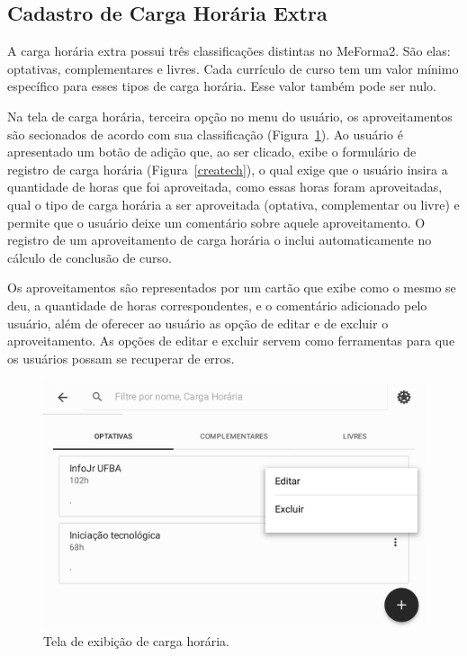 \subsection{Cadastro de Carga Horária Extra}
A carga horária extra possui três classificações distintas no MeForma2. São elas: optativas, complementares e livres. Cada currículo de curso tem um valor mínimo específico para esses tipos de carga horária. Esse valor também pode ser nulo.

Na tela de carga horária, terceira opção no menu do usuário, os aproveitamentos são secionados de acordo com sua classificação (Figura~\ref{ch}). Ao usuário é apresentado um botão de adição que, ao ser clicado, exibe o formulário de registro de carga horária (Figura~\ref{createch}), o qual exige que o usuário insira a quantidade de horas que foi aproveitada, como essas horas foram aproveitadas,  qual o tipo de carga horária a ser aproveitada (optativa, complementar ou livre) e permite que o usuário deixe um comentário sobre aquele aproveitamento. O registro de um aproveitamento de carga horária o inclui automaticamente no cálculo de conclusão de curso.

Os aproveitamentos são representados por um cartão que exibe como o mesmo se deu, a quantidade de horas correspondentes, e o comentário adicionado pelo usuário, além de oferecer ao usuário as opção de editar e de excluir o aproveitamento. As opções de editar e excluir servem como ferramentas para que os usuários possam se recuperar de erros.

\begin{figure}[H]
	   \centering
	   		\includegraphics[scale=0.25]{pics/c3/8-ch.png}
	   \caption{Tela de exibição de carga horária.}
	   \label{ch}
\end{figure}

